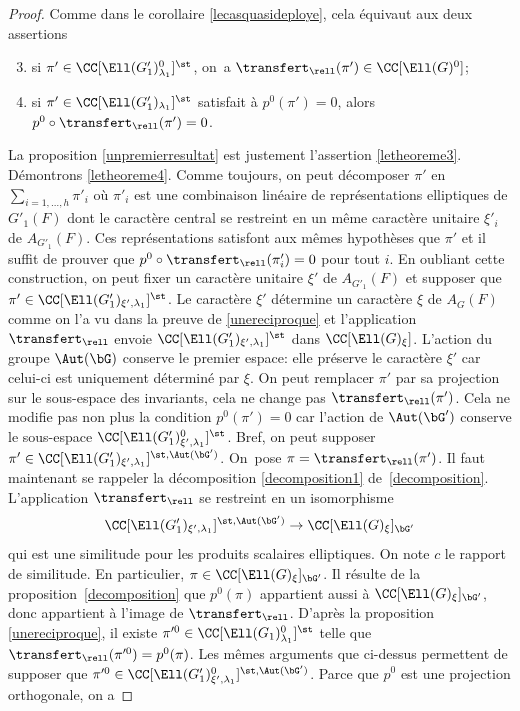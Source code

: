 \begin{proof}
Comme dans le corollaire \ref{lecasquasideploye}, cela équivaut aux deux assertions
\begin{enumerate}\setcounter{enumi}{2}
\item\label{letheoreme3}
si $\pi'\in \CC[\Ell(G'_{1})_{\lambda_{1}}^0]^{\st}$, on~a $\transfert_{\rell}(\pi')\in \CC[\Ell(G)^0]$;

\item\label{letheoreme4}
si $\pi'\in \CC[\Ell(G'_{1})_{\lambda_{1}}]^{\st}$ satisfait à $p^0(\pi')=0$, alors $p^0\circ \transfert_{\rell}(\pi')=0$.
\end{enumerate}

La proposition \ref{unpremierresultat} est justement l'assertion \eqref{letheoreme3}. Démontrons \eqref{letheoreme4}. Comme toujours, on peut décomposer $\pi'$ en $\sum_{i=1,\dots,h}\pi'_{i}$ où $\pi'_{i}$ est une combinaison linéaire de représentations elliptiques de $G'_{1}(F)$ dont le caractère central se restreint en un même caractère unitaire $\xi'_{i}$ de $A_{G'_{1}}(F)$. Ces représentations satisfont aux mêmes hypothèses que $\pi'$ et il suffit de prouver que $p^0\circ \transfert_{\rell}(\pi'_{i})=0$ pour tout $i$. En oubliant cette construction, on peut fixer un caractère unitaire $\xi'$ de $A_{G'_{1}}(F)$ et supposer que $\pi'\in \CC[\Ell(G'_{1})_{\xi',\lambda_{1}}]^{\st}$. Le caractère $\xi'$ détermine un caractère $\xi$ de $A_{G}(F)$ comme on l'a vu dans la preuve de \ref{unereciproque} et l'application $\transfert_{\rell}$ envoie $\CC[\Ell(G'_{1})_{\xi',\lambda_{1}}]^{\st}$ dans $\CC[\Ell(G)_{\xi}]$. L'action du groupe $\Aut(\bG)$ conserve le premier espace: elle préserve le caractère $\xi'$ car celui-ci est uniquement déterminé par $\xi$. On peut remplacer $\pi'$ par sa projection sur le sous-espace des invariants, cela ne change pas $\transfert_{\rell}(\pi')$. Cela ne modifie pas non plus la condition $p^0(\pi')=0$ car l'action de $\Aut(\bG')$ conserve le sous-espace $\CC[\Ell(G'_{1})^0_{\xi',\lambda_{1}}]^{\st}$. Bref, on peut supposer $\pi'\in \CC[\Ell(G'_{1})_{\xi',\lambda_{1}}]^{\st,\Aut(\bG')}$. On~pose $\pi=\transfert_{\rell}(\pi')$. Il faut maintenant se rappeler la décomposition \eqref{decomposition1} de~\ref{decomposition}. L'application $\transfert_{\rell}$ se restreint en un isomorphisme
\[
\CC[\Ell(G'_{1})_{\xi',\lambda_{1}}]^{\st,\Aut(\bG')}\to \CC[\Ell(G)_{\xi}]_{\bG'}
\]
qui est une similitude pour les produits scalaires elliptiques. On note $c$ le rapport de similitude. En particulier, $\pi\in \CC[\Ell(G)_{\xi}]_{\bG'}$. Il résulte de la proposition~\ref{decomposition} que $p^0(\pi)$ appartient aussi à $\CC[\Ell(G)_{\xi}]_{\bG'}$, donc appartient à l'image de $\transfert_{\rell}$. D'après la proposition \ref{unereciproque}, il existe $\pi^{\prime0}\in \CC[\Ell(G_{1})^0_{\lambda_{1}}]^{\st}$ telle que $\transfert_{\rell}(\pi^{\prime0})=p^0(\pi)$. Les mêmes arguments que ci-dessus permettent de supposer que $\pi^{\prime0}\in \CC[\Ell(G'_{1})^0_{\xi',\lambda_{1}}]^{\st,\Aut(\bG')}$. Parce que $p^0$ est une projection orthogonale, on a

\end{proof}

